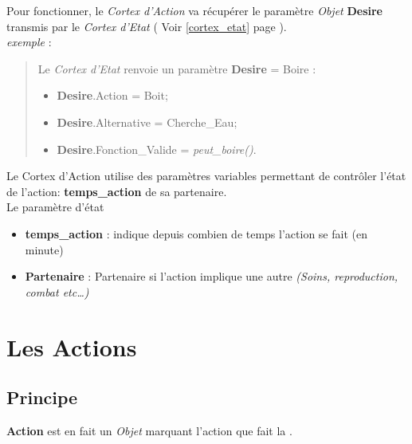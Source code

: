 \documentclass[french]{report}
\newlength{\du}\fi
\begin{document}
Pour fonctionner, le \textit{Cortex d'Action} va récupérer le paramètre \textit{Objet}  \textbf{Desire} transmis par le \textit{Cortex d'Etat} ( Voir \ref{cortex_etat} page \pageref{cortex_etat}).\\

\textit{exemple} : \\
\begin{quote}
	
	Le \textit{Cortex d'Etat} renvoie un paramètre \textbf{Desire} = Boire : \\
	
	\begin{itemize}
		\item \textbf{Desire}.Action = Boit;
		\item \textbf{Desire}.Alternative = Cherche\_Eau;
		\item \textbf{Desire}.Fonction\_Valide = \textit{peut\_boire()}.\\
	\end{itemize}
	
\end{quote}
Le Cortex d'Action utilise des paramètres variables permettant de contrôler l'état de l'action:
\textbf{temps\_action} de sa partenaire.\\
Le paramètre d'état  
\begin{itemize}
	\item \textbf{temps\_action} : indique depuis combien de temps l'action se fait (en minute)
	\item \textbf{Partenaire} : Partenaire si l'action implique une autre \CoCiX \textit{(Soins, reproduction, combat etc\dots)}
\end{itemize}
\section{Les Actions}\label{action}
\subsection{Principe}
\textbf{Action} est en fait un \textit{Objet} marquant l'action que fait la \CoCiX.\\
\end{document}
